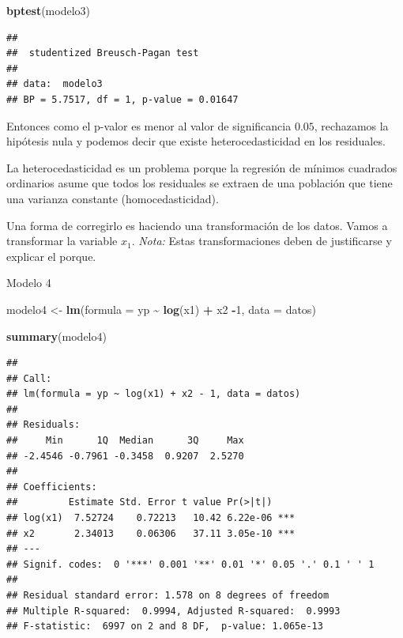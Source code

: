 \documentclass[
]{book}
\newenvironment{Shaded}{\begin{snugshade}}{\end{snugshade}}
\newcommand{\AttributeTok}[1]{\textcolor[rgb]{0.13,0.29,0.53}{#1}}
\newcommand{\DecValTok}[1]{\textcolor[rgb]{0.00,0.00,0.81}{#1}}
\newcommand{\FunctionTok}[1]{\textcolor[rgb]{0.13,0.29,0.53}{\textbf{#1}}}
\newcommand{\NormalTok}[1]{#1}
\newcommand{\OtherTok}[1]{\textcolor[rgb]{0.56,0.35,0.01}{#1}}
\newcommand{\SpecialCharTok}[1]{\textcolor[rgb]{0.81,0.36,0.00}{\textbf{#1}}}
\begin{document}
\begin{Shaded}
\begin{Highlighting}[]
\FunctionTok{bptest}\NormalTok{(modelo3)}
\end{Highlighting}
\end{Shaded}

\begin{verbatim}
## 
##  studentized Breusch-Pagan test
## 
## data:  modelo3
## BP = 5.7517, df = 1, p-value = 0.01647
\end{verbatim}

Entonces como el p-valor es menor al valor de significancia \(0.05\), rechazamos la hipótesis nula y podemos decir que existe heterocedasticidad en los residuales.

La heterocedasticidad es un problema porque la regresión de mínimos cuadrados ordinarios asume que todos los residuales se extraen de una población que tiene una varianza constante (homocedasticidad).

Una forma de corregirlo es haciendo una transformación de los datos. Vamos a transformar la variable \(x_1\).
\emph{Nota:} Estas transformaciones deben de justificarse y explicar el porque.

Modelo 4

\begin{Shaded}
\begin{Highlighting}[]
\NormalTok{modelo4 }\OtherTok{\textless{}{-}} \FunctionTok{lm}\NormalTok{(}\AttributeTok{formula =}\NormalTok{ yp }\SpecialCharTok{\textasciitilde{}} \FunctionTok{log}\NormalTok{(x1) }\SpecialCharTok{+}\NormalTok{ x2 }\SpecialCharTok{{-}}\DecValTok{1}\NormalTok{, }\AttributeTok{data =}\NormalTok{ datos)}

\FunctionTok{summary}\NormalTok{(modelo4)}
\end{Highlighting}
\end{Shaded}

\begin{verbatim}
## 
## Call:
## lm(formula = yp ~ log(x1) + x2 - 1, data = datos)
## 
## Residuals:
##     Min      1Q  Median      3Q     Max 
## -2.4546 -0.7961 -0.3458  0.9207  2.5270 
## 
## Coefficients:
##         Estimate Std. Error t value Pr(>|t|)    
## log(x1)  7.52724    0.72213   10.42 6.22e-06 ***
## x2       2.34013    0.06306   37.11 3.05e-10 ***
## ---
## Signif. codes:  0 '***' 0.001 '**' 0.01 '*' 0.05 '.' 0.1 ' ' 1
## 
## Residual standard error: 1.578 on 8 degrees of freedom
## Multiple R-squared:  0.9994, Adjusted R-squared:  0.9993 
## F-statistic:  6997 on 2 and 8 DF,  p-value: 1.065e-13
\end{verbatim}
\end{document}
